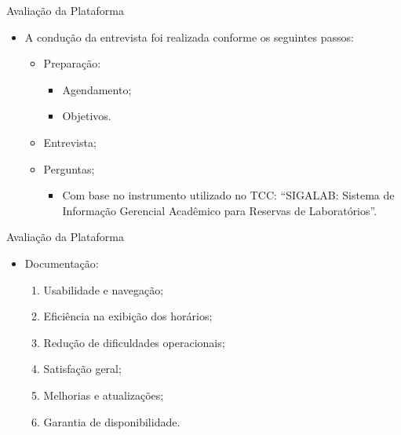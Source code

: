 \begin{frame}{Avaliação da Plataforma}
    \begin{itemize}
        \item A condução da entrevista foi realizada conforme os seguintes passos: \vspace{0.5cm}
              \begin{itemize}
                  \item Preparação: \vspace{0.5cm}
                        \begin{itemize}
                            \item Agendamento; \vspace{0.25cm}
                            \item Objetivos. \vspace{0.5cm}
                        \end{itemize}
                  \item Entrevista; \vspace{0.5cm}
                  \item Perguntas; \vspace{0.25cm}
                  \begin{itemize}
                    \item Com base no instrumento utilizado no TCC: ``SIGALAB: Sistema de Informação Gerencial Acadêmico para Reservas de Laboratórios''.
                  \end{itemize}
              \end{itemize}
    \end{itemize}
\end{frame}

\begin{frame}{Avaliação da Plataforma}
    \begin{itemize}
        \item Documentação: \vspace{0.5cm}
              \begin{enumerate}
                  \item Usabilidade e navegação; \vspace{0.5cm}
                  \item Eficiência na exibição dos horários; \vspace{0.5cm}
                  \item Redução de dificuldades operacionais; \vspace{0.5cm}
                  \item Satisfação geral; \vspace{0.5cm}
                  \item Melhorias e atualizações; \vspace{0.5cm}
                  \item Garantia de disponibilidade. \vspace{0.5cm}
              \end{enumerate}
    \end{itemize}
\end{frame}

